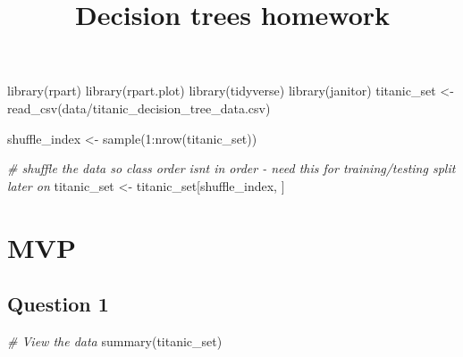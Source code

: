 \documentclass[
]{article}
\title{Decision trees homework}
\author{}
\date{\vspace{-2.5em}}
\newenvironment{Shaded}{\begin{snugshade}}{\end{snugshade}}
\newcommand{\CommentTok}[1]{\textcolor[rgb]{0.56,0.35,0.01}{\textit{#1}}}
\newcommand{\DecValTok}[1]{\textcolor[rgb]{0.00,0.00,0.81}{#1}}
\newcommand{\FunctionTok}[1]{\textcolor[rgb]{0.00,0.00,0.00}{#1}}
\newcommand{\NormalTok}[1]{#1}
\newcommand{\OtherTok}[1]{\textcolor[rgb]{0.56,0.35,0.01}{#1}}
\newcommand{\SpecialCharTok}[1]{\textcolor[rgb]{0.00,0.00,0.00}{#1}}
\newcommand{\StringTok}[1]{\textcolor[rgb]{0.31,0.60,0.02}{#1}}
\begin{document}
\maketitle

\begin{Shaded}
\begin{Highlighting}[]
\FunctionTok{library}\NormalTok{(rpart)}
\FunctionTok{library}\NormalTok{(rpart.plot)}
\FunctionTok{library}\NormalTok{(tidyverse)}
\FunctionTok{library}\NormalTok{(janitor)}
\NormalTok{titanic\_set }\OtherTok{\textless{}{-}} \FunctionTok{read\_csv}\NormalTok{(}\StringTok{\textquotesingle{}data/titanic\_decision\_tree\_data.csv\textquotesingle{}}\NormalTok{)}

\NormalTok{shuffle\_index }\OtherTok{\textless{}{-}} \FunctionTok{sample}\NormalTok{(}\DecValTok{1}\SpecialCharTok{:}\FunctionTok{nrow}\NormalTok{(titanic\_set))}

\CommentTok{\# shuffle the data so class order isn\textquotesingle{}t in order {-} need this for training/testing split later on }
\NormalTok{titanic\_set }\OtherTok{\textless{}{-}}\NormalTok{ titanic\_set[shuffle\_index, ]}
\end{Highlighting}
\end{Shaded}

\hypertarget{mvp}{%
\section{MVP}\label{mvp}}

\hypertarget{question-1}{%
\subsection{Question 1}\label{question-1}}

\begin{Shaded}
\begin{Highlighting}[]
\CommentTok{\# View the data}
\FunctionTok{summary}\NormalTok{(titanic\_set)}
\end{Highlighting}
\end{Shaded}
\end{document}

